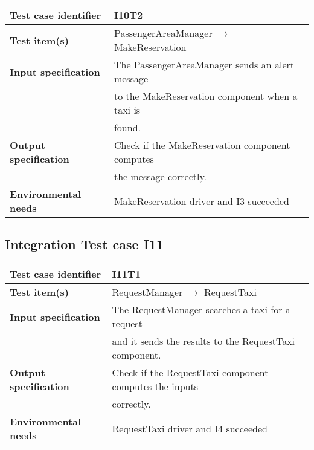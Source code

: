 		\vspace{1cm}
		\noindent
		\begin{adjustbox}{max width=\textwidth}
			\begin{tabular}{ l l}
				\hline 		\textbf{Test case identifier} & I10T2 \\
				\hline		\textbf{Test item(s)}  & PassengerAreaManager $\rightarrow$ MakeReservation \\
				\hline		\textbf{Input specification} & The PassengerAreaManager sends an alert message\\ & to the MakeReservation component when a taxi is \\ & found.\\
				\hline		\textbf{Output specification} &  Check if the MakeReservation component computes \\ & the message correctly.\\
				\hline		\textbf{Environmental needs} & MakeReservation driver and I3 succeeded\\
				\hline
			\end{tabular}
		\end{adjustbox}
			
	\hypertarget{chapter 3.11}{ }
	\subsection{Integration Test case I11}
		\begin{adjustbox}{max width=\textwidth}
			\begin{tabular}{ l l}
				\hline 		\textbf{Test case identifier} & I11T1 \\
				\hline		\textbf{Test item(s)}  & RequestManager $\rightarrow$ RequestTaxi \\
				\hline		\textbf{Input specification} & The RequestManager searches a taxi for a request\\ & and it sends the results to the RequestTaxi component.\\
				\hline		\textbf{Output specification} & Check if the RequestTaxi component computes the inputs\\ & correctly.\\
				\hline		\textbf{Environmental needs} & RequestTaxi driver and I4 succeeded\\
				\hline
			\end{tabular}
		\end{adjustbox}
		
		\vspace{1cm}
		
